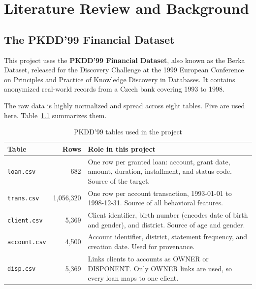 \chapter{Literature Review and Background}
\label{ch:literature}

\section{The PKDD'99 Financial Dataset}
\label{sec:dataset}
This project uses the \textbf{PKDD'99 Financial Dataset}, also known as the Berka Dataset, released for the Discovery Challenge at the 1999 European Conference on Principles and Practice of Knowledge Discovery in Databases. It contains anonymized real-world records from a Czech bank covering 1993 to 1998.

The raw data is highly normalized and spread across eight tables. Five are used here. Table~\ref{tab:pkdd_tables} summarizes them.

\begin{table}[H]
    \centering
    \small
    \renewcommand{\arraystretch}{1.25}
    \begin{tabularx}{\textwidth}{|l|r|>{\raggedright\arraybackslash}X|}
        \hline
        \textbf{Table} & \textbf{Rows} & \textbf{Role in this project} \\
        \hline
        \texttt{loan.csv} & 682 & One row per granted loan: account, grant date, amount, duration, installment, and status code. Source of the target. \\
        \hline
        \texttt{trans.csv} & 1,056,320 & One row per account transaction, 1993-01-01 to 1998-12-31. Source of all behavioral features. \\
        \hline
        \texttt{client.csv} & 5,369 & Client identifier, birth number (encodes date of birth and gender), and district. Source of age and gender. \\
        \hline
        \texttt{account.csv} & 4,500 & Account identifier, district, statement frequency, and creation date. Used for provenance. \\
        \hline
        \texttt{disp.csv} & 5,369 & Links clients to accounts as OWNER or DISPONENT. Only OWNER links are used, so every loan maps to one client. \\
        \hline
    \end{tabularx}
    \caption{PKDD'99 tables used in the project}
    \label{tab:pkdd_tables}
\end{table}

